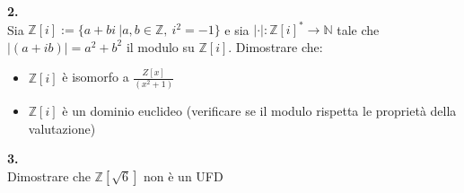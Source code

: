 \documentclass[italian,a4paper,11pt]
{article}
\newcommand{\Z}{\mathbb Z}
\newcommand{\N}{\mathbb{N}}
\newcommand{\acc}{\`}
\begin{document}
\vspace{0.4 cm}
\noindent
\begin{Ex}\textbf{ 2.}\\
Sia $\Z[i]:=\{ a+bi \ | a,b\in \Z, \ i^2=-1\}$ e sia $|\cdot|: \Z[i]^* \rightarrow \N $ tale che $|(a+ib)|=a^2+b^2$ il modulo su $\Z[i]$. Dimostrare che:
\begin{itemize}
\item $\Z[i]$ \acc e isomorfo a $\frac {Z[x]}{(x^2+1)}$
\item $\Z[i]$ \acc e un dominio euclideo (verificare se il modulo rispetta le propriet\acc a della valutazione)
\end{itemize}
\end{Ex}


\vspace{0.4 cm}
\noindent
\begin{Ex}\textbf{ 3.}\\
Dimostrare che $\Z[\sqrt 6]$ non \acc e un UFD
\end{Ex}
\end{document}
